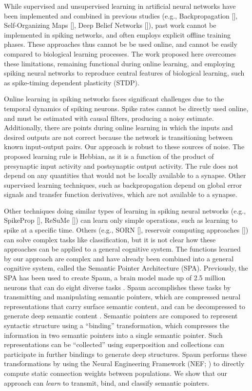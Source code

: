 \documentclass[10pt,letterpaper]{article}
\begin{document}
While supervised and unsupervised learning
in artificial neural networks have been
implemented and combined in previous studies
(e.g., Backpropagation [],
Self-Organizing Maps [],
Deep Belief Networks []),
past work cannot be implemented in spiking networks,
and often employs explicit offline training phases.
These approaches thus cannot be be used online,
and cannot be easily compared to biological learning processes.
The work proposed here overcomes these limitations,
remaining functional during online learning,
and employing spiking neural networks
to reproduce central features of biological learning,
such as spike-timing dependent plasticity (STDP).

Online learning in spiking networks
faces significant challenges
due to the temporal dynamics of spiking neurons.
Spike rates cannot be directly used online,
and must be estimated with causal filters,
producing a noisy estimate.
Additionally, there are points during online learning
in which the inputs and desired outputs
are not correct because the network
is transitioning between known input-output pairs.
Our approach is robust to these sources of noise.
The proposed learning rule is Hebbian,
as it is a function of the product of
presynaptic input activity and postsynaptic output activity.
The rule does not depend on any quantities that
would not be locally available
to a synapse.
Other supervised learning techniques,
such as backpropagation \cite{Rumelhart1986}
depend on global error signals
and transfer function derivatives,
which are not available to a synapse.

Other techniques doing similar types of learning
in spiking neural networks
(e.g., SpikeProp [], ReSuMe [])
can learn only simple operations,
such as learning to spike at a specific time.
Others (e.g., SORN [], reservoir computing approaches
[]) can solve complex tasks like classification,
but it is not clear how these approaches can be applied
to a general cognitive system.
The functions learned by our approach are
complex and have already been combined into
a general cognitive system, called the
Semantic Pointer Architecture (SPA).
Previously, the SPA has been used to create Spaun,
a brain model made up of 2.5 million neurons
that can do eight diverse tasks \cite{Eliasmith2012}.
Spaun accomplishes these tasks by
transmitting and manipulating semantic pointers,
which are compressed neural representations
that carry surface semantic content,
and can be decompressed to generate
deep semantic content \cite{EliasmithInPress}.
Semantic pointers are composed to represent syntactic structure
using a ``binding'' transformation,
which compresses the information in two semantic pointers
into a single semantic pointer.
Such representations can be ``collected''
using superposition and collections
can participate in further bindings to generate deep structures.
Spaun performs these transformations by using
the Neural Engineering Framework (NEF; )
to directly compute static connection weights between populations.
We show that our approach can \textit{learn} to transmit, bind,
and classify semantic pointers.
\end{document}
